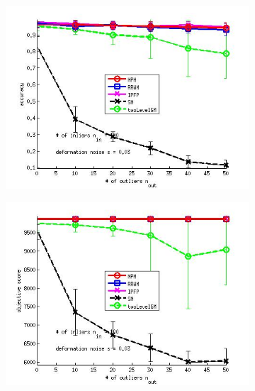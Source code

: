 \begin{figure}[h] 
	\begin{subfigure}[b]{0.3\textwidth}
		\centering
		\includegraphics[scale=0.25]{"chapter3/fig/SyntheticTest/ver4.3.2/outliertest_n50/accuracy_avg10t"} 
	\end{subfigure}%
	\begin{subfigure}[b]{0.3\textwidth}
		\centering
		\includegraphics[scale=0.25]{"chapter3/fig/SyntheticTest/ver4.3.2/outliertest_n50/score_avg10t"} 
	\end{subfigure} 
	\begin{subfigure}[b]{0.3\textwidth}
		\centering

\end{subfigure}
\end{figure}
